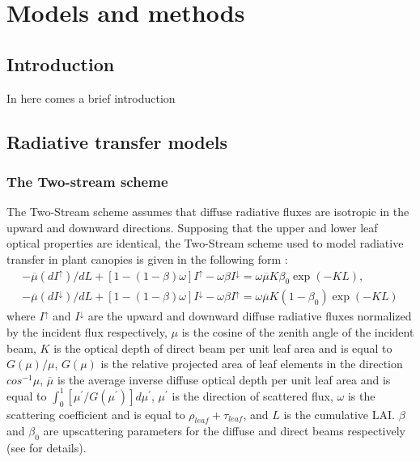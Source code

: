 \documentclass[a4paper,11pt]{report}
\title{}
\author{Renato Kerches Braghiere \\ This document was written in \LaTeX \\ Number of words: 18135}
\date{\today}
\begin{document}
\maketitle
\setcounter{chapter}{2} %

\chapter{Models and methods}

\section{Introduction}\label{introduction}

In here comes a brief introduction

\section{Radiative transfer models}\label{section:RTMs}

\subsection{The Two-stream scheme} 
The Two-Stream scheme assumes that diffuse radiative fluxes are isotropic in the upward and downward directions. Supposing that the upper and lower leaf optical properties are identical, the Two-Stream scheme used to model radiative transfer in plant canopies is given in the following form \citep{Dickinson1983,Sellers1985}: 
\begin{equation}
\begin{gathered}
-\overline{\mu}(dI^{\uparrow})/dL + [1 - (1 - \beta)\omega]I^{\uparrow} - \omega \beta I^{\downarrow} = \omega \overline{\mu} K \beta_0 \exp{(-KL)},\\
-\overline{\mu}(dI^{\downarrow})/dL + [1 - (1 - \beta)\omega]I^{\downarrow} - \omega \beta I^{\uparrow} = \omega \overline{\mu} K (1-\beta_0) \exp{(-KL)}
\end{gathered}
\label{equation:ts}
\end{equation}
\noindent where $I^{\uparrow}$ and $I^{\downarrow}$ are the upward and downward diffuse radiative fluxes normalized by the incident flux respectively, $\mu$ is the cosine of the zenith angle of the incident beam, $K$ is the optical depth of direct beam per unit leaf area and is equal to $G(\mu)/\mu$, $G(\mu)$ is the relative projected area of leaf elements in the direction $cos^{-1}\mu$, $\overline{\mu}$ is the average inverse diffuse optical depth per unit leaf area and is equal to $\int_{0}^{1}[\mu^{\prime}/G(\mu^{\prime})]d\mu^{\prime}$, $\mu^{\prime}$ is the direction of scattered flux, $\omega$ is the scattering coefficient and is equal to $\rho_{leaf} + \tau_{leaf}$, and $L$ is the cumulative LAI. $\beta$ and $\beta_0$ are upscattering parameters for the diffuse and direct beams respectively (see \citet{Sellers1985} for details). 
\end{document}
